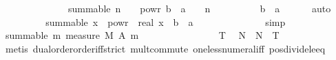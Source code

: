 \begin{isabellebody}
\ \ \ \ \isamarkupfalse%
\ {\isacharminus}{\kern0pt}\isanewline
\ \ \ \ \ \ \isamarkupfalse%
\ {\isachardoublequoteopen}summable\ {\isacharparenleft}{\kern0pt}{\isasymlambda}n{\isachardot}{\kern0pt}\ {\isacharparenleft}{\kern0pt}{}\ {\isacharslash}{\kern0pt}\ {}\ powr\ {\isacharparenleft}{\kern0pt}b\ {\isacharminus}{\kern0pt}\ a\ {\isacharasterisk}{\kern0pt}\ {\isasymgamma}{\isacharparenright}{\kern0pt}{\isacharparenright}{\kern0pt}\ {\isacharcircum}{\kern0pt}\ n{\isacharparenright}{\kern0pt}{\isachardoublequoteclose}\isanewline
\ \ \ \ \ \ \ \ \isamarkupfalse%
\ {\isacartoucheopen}b\ {\isacharminus}{\kern0pt}\ a\ {\isacharasterisk}{\kern0pt}\ {\isasymgamma}\ {\isachargreater}{\kern0pt}\ {}{\isacartoucheclose}\ \isamarkupfalse%
\ auto\isanewline
\ \ \ \ \ \ \isamarkupfalse%
\ \isamarkupfalse%
\ {\isachardoublequoteopen}summable\ {\isacharparenleft}{\kern0pt}{\isasymlambda}x{\isachardot}{\kern0pt}\ {}\ powr\ {\isacharparenleft}{\kern0pt}{\isacharminus}{\kern0pt}\ real\ x\ {\isacharasterisk}{\kern0pt}\ {\isacharparenleft}{\kern0pt}b\ {\isacharminus}{\kern0pt}\ a\ {\isacharasterisk}{\kern0pt}\ {\isasymgamma}{\isacharparenright}{\kern0pt}{\isacharparenright}{\kern0pt}{\isacharparenright}{\kern0pt}{\isachardoublequoteclose}\isanewline
\ \ \ \ \ \ \ \ \isamarkupfalse%
\ {}\ \isamarkupfalse%
\ simp\isanewline
\ \ \ \ \isamarkupfalse%
\isanewline
\ \ \ \ \isamarkupfalse%
\ {\isachardoublequoteopen}summable\ {\isacharparenleft}{\kern0pt}{\isasymlambda}m{\isachardot}{\kern0pt}\ measure\ {\isacharquery}{\kern0pt}M\ {\isacharparenleft}{\kern0pt}A\ m{\isacharparenright}{\kern0pt}{\isacharparenright}{\kern0pt}{\isachardoublequoteclose}\isanewline
\ \ \ \ \isamarkupfalse%
\ {\isacharminus}{\kern0pt}\isanewline
\ \ \ \ \ \ \isamarkupfalse%
\ {\isacartoucheopen}{}\ {\isacharless}{\kern0pt}\ T{\isacartoucheclose}\ \isamarkupfalse%
\ N\ \ {\isachardoublequoteopen}{}{\isacharcircum}{\kern0pt}N\ {\isacharasterisk}{\kern0pt}\ T\ {\isasymge}\ {}{\isachardoublequoteclose}\isanewline
\ \ \ \ \ \ \ \ \isamarkupfalse%
\ {\isacharparenleft}{\kern0pt}metis\ dual{\isacharunderscore}{\kern0pt}order{\isachardot}{\kern0pt}order{\isacharunderscore}{\kern0pt}iff{\isacharunderscore}{\kern0pt}strict\ mult{\isachardot}{\kern0pt}commute\ one{\isacharunderscore}{\kern0pt}less{\isacharunderscore}{\kern0pt}numeral{\isacharunderscore}{\kern0pt}iff\ pos{\isacharunderscore}{\kern0pt}divide{\isacharunderscore}{\kern0pt}le{\isacharunderscore}{\kern0pt}eq\isanewline

\end{isabellebody}
